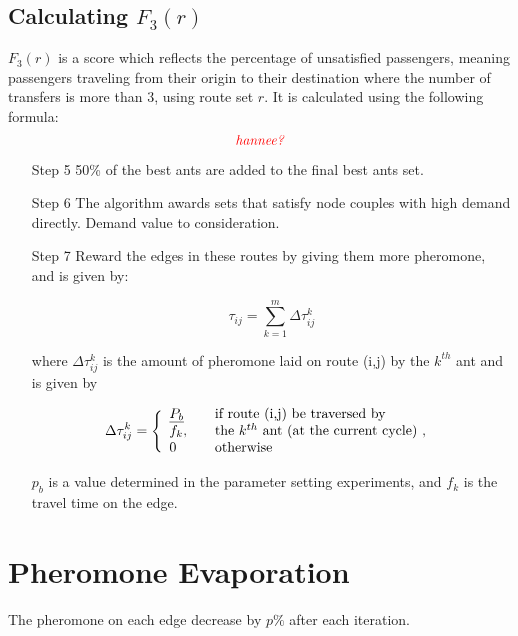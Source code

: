 

\subsection{Calculating $F_3(r)$}
$F_3(r)$ is a score which reflects the percentage of unsatisfied passengers, meaning passengers traveling from their origin to their destination where the number of transfers is more than 3, using route set $r$. It is calculated using the following formula:
$$\emph{\color{red}hannee?}$$

\begin{itemize}
\item[Step 5] 50\% of the best ants are added to the final best ants set.
\item[Step 6] The algorithm awards sets that satisfy node couples with high demand directly. Demand value to consideration.
\item[Step 7] Reward the edges in these routes by giving them more pheromone, and is given by:

$$ \tau_{ij} = \sum_{k=1}^{m} \Delta \tau^k_{ij}$$

where $ \Delta \tau^k_{ij} $ is the amount of pheromone laid on route (i,j) by the $k^{th}$ ant and is given by

$$
\Delta \tau^k_{ij} = \Bigg\{
\begin{array}{l l}
\underline{P_{b}} &  \quad \text{if route (i,j) be traversed by}\\
f_k, &  \quad \text{the $k^{th}$ ant (at the current cycle) , }\\
0 &  \quad \text{otherwise}
\end{array}
$$

$p_b$ is a value determined in the parameter setting experiments, and $f_k$ is the travel time on the edge.

\end{itemize}

\section{Pheromone Evaporation}

The pheromone on each edge decrease by $p\%$ after each iteration. 